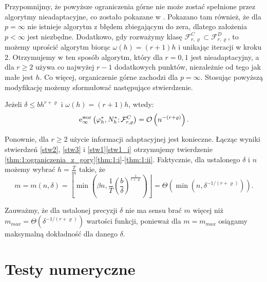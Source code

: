 \documentclass[oik, pdftex, robocza, man]{mgrwms}
\begin{document}
    Przypomnijmy, że powyższe ograniczenia górne nie może zostać spełnione przez algorytmy nieadaptacyjne, co zostało pokazane w \cite{PoA}. Pokazano tam również, że dla $p=\infty$ nie istnieje algorytm z błędem zbiegającym do zera, dlatego założenia $p < \infty$ jest niezbędne. Dodatkowo, gdy rozważymy klasę $\mathcal{F}_{r, \varrho}^{C} \subset \mathcal{F}_{r, \varrho}^{D}$, to możemy uprościć algorytm biorąc $\omega(h) = (r+1)h$ i unikając iteracji w kroku 2. Otrzymujemy w ten sposób algorytm, który dla $r=0,1$ jest nieadaptacyjny, a dla $r \geq 2$ używa co najwyżej $r-1$ dodatkowych punktów, niezależnie od tego jak małe jest $h$. Co więcej, organiczenie górne zachodzi dla $p = \infty$.
    Stosując powyższą modyfikację możemy sformułować następujące stwierdzenie.

    \begin{stw}
        \label{stw3}
        Jeżeli $\delta \leq bh^{r+\varrho}$ i $\omega(h) = (r+1)h$, wtedy:
        \begin{equation}
            \mathrm{e}_{\infty}^{\mathrm{\mathrm{wor}}}\left(\varphi_{h}^{*}, N_{h}^{*} ; \mathcal{F}_{r, \varrho}^{C}\right)=\mathcal{O}\left(n^{-(r+\varrho)}\right) .
        \end{equation}
    \end{stw}

    Ponownie, dla $r \geq 2$ użycie informacji adaptacyjnej jest konieczne. Łącząc wyniki stwierdzeń \ref{stw2}, \ref{stw3} i \ref{stw1}\ref{stw1_i} otrzymujemy twierdzenie \ref{thm:1:ograniczenia_z_gory}\ref{thm:1:i}-\ref{thm:1:ii}.
    Faktycznie, dla ustalonego $\delta$ i $n$ możemy wybrać $h = \frac{T}{m}$ takie, że
    \begin{equation}
        m = m(n, \delta)=\left\lfloor\min \left(\beta n, \frac{1}{T}\left(\frac{b}{\delta}\right)^{\frac{1}{r+\varrho}}\right)\right\rfloor=\varTheta\left(\min \left(n, \delta^{-1 /(r+\varrho)}\right)\right).
    \end{equation}

    \begin{uw} \label{uw:2}
        Zauważmy, że dla ustalonej precyzji $\delta$ nie ma sensu brać $m$ więcej niż $m_{max} = \varTheta(\delta^{-1 / (r+\varrho)})$ wartości funkcji, ponieważ dla $m = m_{max}$ osiągamy maksymalną dokładność dla danego $\delta$.
    \end{uw}

\mgrclosechapter


\chapter{Testy numeryczne}
\end{document}
